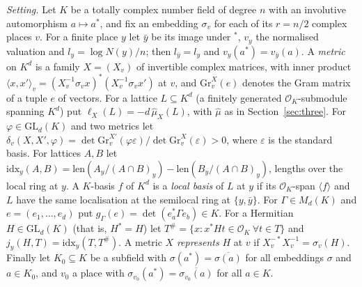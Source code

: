 \documentclass[11pt]{amsart}
\newcommand{\Oc}{\mathcal{O}}
\theoremstyle{plain}
\theoremstyle{definition}
\numberwithin{equation}{section}
\begin{document}
\emph{Setting.} Let $K$ be a totally complex number field of degree $n$ with an involutive
automorphism $a\mapsto a^\ast$, and fix an embedding $\sigma_v$ for each of its $r=n/2$ complex
places $v$. For a finite place $y$ let $\bar y$ be its image under ${}^\ast$, $v_y$ the
normalised valuation and $l_y=\log N(y)/n$; then $l_{\bar y}=l_y$ and $v_y(a^\ast)=v_{\bar y}(a)$. A
\emph{metric} on $K^d$ is a family $X=(X_v)$ of invertible complex matrices, with inner product
$\langle x,x'\rangle_v=(X_v^{-1}\sigma_vx)^\ast(X_v^{-1}\sigma_vx')$ at $v$, and $\mathrm{Gr}^X_v(e)$ denotes
the Gram matrix of a tuple $e$ of vectors. For a lattice $L\subseteq K^d$ (a finitely generated
$\Oc_K$-submodule spanning $K^d$) put $\ell_X(L)=-d\,\hat\mu_X(L)$, with $\hat\mu$ as in
Section~\ref{sec:three}. For $\varphi\in\mathrm{GL}_d(K)$ and two metrics let
$\delta_v(X,X',\varphi)=\det\mathrm{Gr}^{X'}_v(\varphi\varepsilon)/\det\mathrm{Gr}^X_v(\varepsilon)>0$, where
$\varepsilon$ is the standard basis. For lattices $A,B$ let
$\mathrm{idx}_y(A,B)=\mathrm{len}(A_y/(A\cap B)_y)-\mathrm{len}(B_y/(A\cap B)_y)$, lengths over the local
ring at $y$. A $K$-basis $f$ of $K^d$ is a \emph{local basis} of $L$ at $y$ if its $\Oc_K$-span
$\langle f\rangle$ and $L$ have the same localisation at the semilocal ring at $\{y,\bar y\}$. For
$\Gamma\in M_d(K)$ and $e=(e_1,\dots,e_d)$ put $g_\Gamma(e)=\det(e_a^\ast\Gamma e_b)\in K$. For a
Hermitian $H\in\mathrm{GL}_d(K)$ (that is, $H^\ast=H$) let $T^\#=\{x:x^\ast Ht\in\Oc_K\ \forall t\in T\}$ and
$j_y(H,T)=\mathrm{idx}_y(T,T^\#)$. A metric $X$ \emph{represents} $H$ at $v$ if
$X_v^{-\ast}X_v^{-1}=\sigma_v(H)$. Finally let $K_0\subseteq K$ be a subfield with
$\sigma(a^\ast)=\overline{\sigma(a)}$ for all embeddings $\sigma$ and $a\in K_0$, and $v_0$ a place with
$\sigma_{v_0}(a^\ast)=\overline{\sigma_{v_0}(a)}$ for all $a\in K$.
\end{document}
